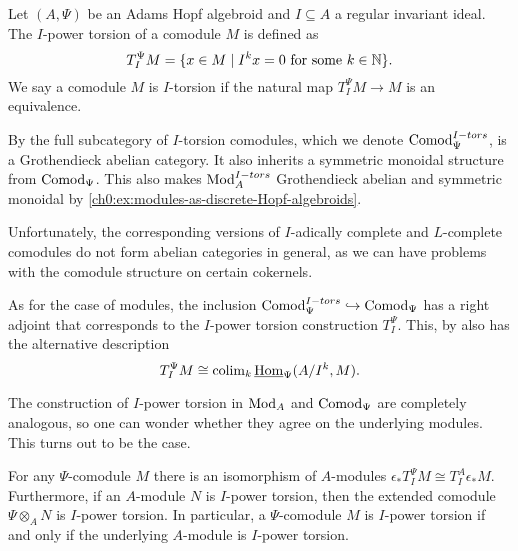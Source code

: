 \begin{definition}
    \label{ch0:def:I-power-torsion-comodule}
    Let $(A,\Psi)$ be an Adams Hopf algebroid and $I\subseteq A$ a regular invariant ideal. The $I$-power torsion of a comodule $M$ is defined as 
    $$T_I^\Psi M = \{x\in M \mid I^kx = 0 \text{ for some } k\in \mathbb{N}\}.$$
    We say a comodule $M$ is { $I$-torsion} if the natural map $T_I^\Psi M\longrightarrow M$ is an equivalence. 
\end{definition}

\begin{remark}
    \label{ch0:rm:torsion-comodules-grothendieck-monoidal}
    By \cite[5.10]{barthel-heard-valenzuela_2018} the full subcategory of $I$-torsion comodules, which we denote { $\mathrm{Comod}_\Psi^{I-tors}$}, is a Grothendieck abelian category. It also inherits a symmetric monoidal structure from $\mathrm{Comod}_\Psi$. This also makes $\mathrm{Mod}_A^{I-tors}$ Grothendieck abelian and symmetric monoidal by \cref{ch0:ex:modules-as-discrete-Hopf-algebroids}. 
\end{remark}

\begin{remark}
    \label{ch0:rm:complete-comodules-not-abelian}
    Unfortunately, the corresponding versions of $I$-adically complete and $L$-complete comodules do not form abelian categories in general, as we can have problems with the comodule structure on certain cokernels.
\end{remark}

As for the case of modules, the inclusion $\mathrm{Comod}_\Psi^{I-tors}\hookrightarrow \mathrm{Comod}_\Psi$ has a right adjoint that corresponds to the $I$-power torsion construction $T_I^\Psi$. This, by \cite[5.5]{barthel-heard-valenzuela_2018} also has the alternative description
$$T_I^\Psi M \cong \operatorname{colim}_k \operatorname{\underline{Hom}}_\Psi (A/I^k, M).$$

The construction of $I$-power torsion in $\mathrm{Mod}_A$ and $\mathrm{Comod}_\Psi$ are completely analogous, so one can wonder whether they agree on the underlying modules. This turns out to be the case. 

\begin{lemma}
    \label{ch0:lm:torsion-comodule-iff-torsion-module}
    For any $\Psi$-comodule $M$ there is an isomorphism of $A$-modules $\epsilon_* T^\Psi_I M \cong T^A_I \epsilon_* M.$
    Furthermore, if an $A$-module $N$ is $I$-power torsion, then the extended comodule $\Psi\otimes_A N$ is $I$-power torsion. In particular, a $\Psi$-comodule $M$ is $I$-power torsion if and only if the underlying $A$-module is $I$-power torsion. 
\end{lemma}

